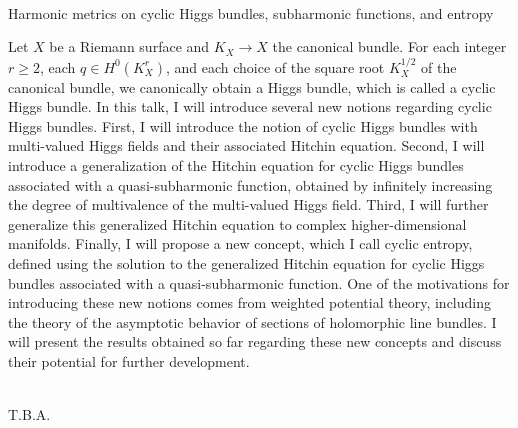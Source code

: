 \documentclass[dvipdfmx,a4paper,12pt]{article}
\theoremstyle{plain} %
\theoremstyle{definition} %
\begin{document}
\\
Harmonic metrics on cyclic Higgs bundles, subharmonic functions, and entropy

\vskip1mm
Let $X$ be a Riemann surface and $K_X \rightarrow X$ the canonical bundle. For each integer $r \geq 2$, each $q \in H^0(K_X^r)$, and each choice of the square root $K_X^{1/2}$ of the canonical bundle, we canonically obtain a Higgs bundle, which is called a cyclic Higgs bundle. In this talk, I will introduce several new notions regarding cyclic Higgs bundles. First, I will introduce the notion of cyclic Higgs bundles with multi-valued Higgs fields and their associated Hitchin equation. Second, I will introduce a generalization of the Hitchin equation for cyclic Higgs bundles associated with a quasi-subharmonic function, obtained by infinitely increasing the degree of multivalence of the multi-valued Higgs field. Third, I will further generalize this generalized Hitchin equation to complex higher-dimensional manifolds. Finally, I will propose a new concept, which I call cyclic entropy, defined using the solution to the generalized Hitchin equation for cyclic Higgs bundles associated with a quasi-subharmonic function. One of the motivations for introducing these new notions comes from weighted potential theory, including the theory of the asymptotic behavior of sections of holomorphic line bundles. I will present the results obtained so far regarding these new concepts and discuss their potential for further development.
\vskip4mm

\\
T.B.A.

\vskip1mm

\end{document}
